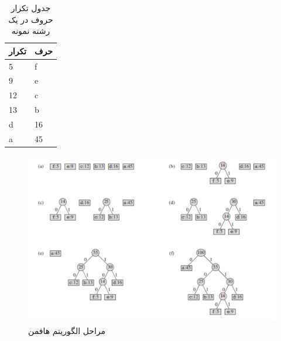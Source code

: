 \begin{table}[H]
        \centering
        \caption{جدول تکرار حروف در یک رشته نمونه}
        \label{example_2}
        \begin{tabular}{ll}
        \hline
        تکرار & حرف \\ \hline
        5 & f \\
        9 & e \\
        12 & c \\
        13 & b \\
        d & 16 \\
        a & 45 \\ \hline
        \end{tabular}
\end{table}

\begin{figure}[H]
        \centering
        \includegraphics[width=\textwidth]{figs/huffamn_tree.png}
        \caption[مراحل الگوریتم هافمن]{مراحل الگوریتم هافمن \cite{huffman_tree}}
        \label{huffman_tree}
\end{figure}

